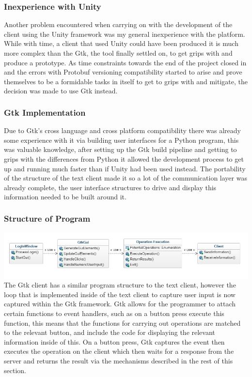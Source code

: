 \documentclass{article}
\begin{document}
\subsubsection{Inexperience with Unity}

Another problem encountered when carrying on with the development of the client using the Unity framework was my general inexperience with the platform. While with time, a client that used Unity could have been produced it is much more complex than the Gtk, the tool finally settled on, to get grips with and produce a prototype. As time constraints towards the end of the project closed in and the errors with Protobuf versioning compatibility started to arise and prove themselves to be a formidable tasks in itself to get to grips with and mitigate, the decision was made to use Gtk instead.

\subsubsection{Gtk Implementation}

Due to Gtk’s cross language and cross platform compatibility there was already some experience with it via building user interfaces for a Python program, this was valuable knowledge, after setting up the Gtk build pipeline and getting to grips with the differences from Python it allowed the development process to get up and running much faster than if Unity had been used instead. The portability of the structure of the text client made it so a lot of the communication layer was already complete, the user interface structures to drive and display this information needed to be built around it.
\subsubsection{Structure of Program}
\includegraphics[width=\textwidth]{gtkclient.png}
The Gtk client has a similar program structure to the text client, however the loop that is implemented inside of the text client to capture user input is now captured within the Gtk framework. Gtk allows for the programmer to attach certain functions to event handlers, such as on a button press execute this function, this means that the functions for carrying out operations are matched to the relevant button, and include the code for displaying the relevant information inside of this. On a button press, Gtk captures the event then executes the operation on the client which then waits for a response from the server and returns the result via the mechanisms described in the rest of this section.
\end{document}
